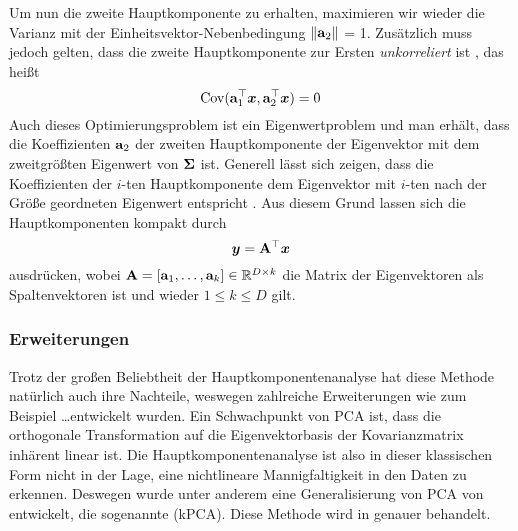 Um nun die zweite Hauptkomponente zu erhalten, maximieren wir wieder die Varianz mit der Einheitsvektor-Nebenbedingung $\left\lVert\mathbf{a}_2\right\rVert$ = 1. Zusätzlich muss jedoch gelten, dass die zweite Hauptkomponente zur Ersten \textit{unkorreliert} ist \parencite[5]{Jolliffe.2002}, das heißt
\begin{equation}
	\operatorname{Cov}(\mathbf{a}_1^\top\bm{x}, \mathbf{a}_2^\top\bm{x}) = 0
\end{equation}
Auch dieses Optimierungsproblem ist ein Eigenwertproblem und man erhält, dass die Koeffizienten $\mathbf{a}_2$ der zweiten Hauptkomponente der Eigenvektor mit dem zweitgrößten Eigenwert von $\mathbf{\Sigma}$ ist.
Generell lässt sich zeigen, dass die Koeffizienten der $i$-ten Hauptkomponente dem Eigenvektor mit $i$-ten nach der Größe geordneten Eigenwert entspricht \parencite[6]{Jolliffe.2002}. Aus diesem Grund lassen sich die Hauptkomponenten kompakt durch
\begin{equation}
	\bm{y} = \mathbf{A}^\top \bm{x}
\end{equation}
ausdrücken, wobei $\mathbf{A} = [\mathbf{a}_1,\ldots,\mathbf{a}_k] \in \mathbb{R}^{D \times k}$ die Matrix der Eigenvektoren als Spaltenvektoren ist und wieder $1 \leq k \leq D$ gilt.

\subsubsection{Erweiterungen}
\label{ch:MethodenDerDimRed:traditionell:PCA:Erweiterungen}
Trotz der großen Beliebtheit der Hauptkomponentenanalyse hat diese Methode natürlich auch ihre Nachteile, weswegen zahlreiche Erweiterungen wie zum Beispiel \ldots\addref entwickelt wurden.
Ein Schwachpunkt von PCA ist, dass die orthogonale Transformation auf die Eigenvektorbasis der Kovarianzmatrix inhärent linear ist. Die Hauptkomponentenanalyse ist also in dieser klassischen Form nicht in der Lage, eine nichtlineare Mannigfaltigkeit in den Daten zu erkennen. Deswegen wurde unter anderem eine Generalisierung von PCA von \textcite{Scholkopf.1997} entwickelt, die sogenannte  (kPCA). Diese Methode wird in  genauer behandelt.


